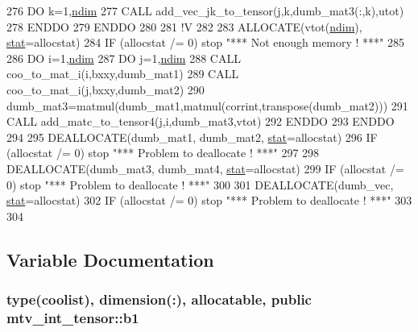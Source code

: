 \begin{DoxyCode}
276        \textcolor{keywordflow}{DO} k=1,\hyperlink{namespaceparams_a2323fe1773f086e20c14f266351c482b}{ndim}
277           \textcolor{keyword}{CALL }add\_vec\_jk\_to\_tensor(j,k,dumb\_mat3(:,k),utot)
278 \textcolor{keywordflow}{       ENDDO}
279 \textcolor{keywordflow}{    ENDDO}
280     
281     \textcolor{comment}{!V}
282     
283     \textcolor{keyword}{ALLOCATE}(vtot(\hyperlink{namespaceparams_a2323fe1773f086e20c14f266351c482b}{ndim}), \hyperlink{namespacestat}{stat}=allocstat)
284     \textcolor{keywordflow}{IF} (allocstat /= 0) stop \textcolor{stringliteral}{"*** Not enough memory ! ***"}
285 
286     \textcolor{keywordflow}{DO} i=1,\hyperlink{namespaceparams_a2323fe1773f086e20c14f266351c482b}{ndim}
287        \textcolor{keywordflow}{DO} j=1,\hyperlink{namespaceparams_a2323fe1773f086e20c14f266351c482b}{ndim}
288           \textcolor{keyword}{CALL }coo\_to\_mat\_i(i,bxxy,dumb\_mat1)
289           \textcolor{keyword}{CALL }coo\_to\_mat\_i(j,bxxy,dumb\_mat2)
290           dumb\_mat3=matmul(dumb\_mat1,matmul(corrint,transpose(dumb\_mat2)))
291           \textcolor{keyword}{CALL }add\_matc\_to\_tensor4(j,i,dumb\_mat3,vtot)
292 \textcolor{keywordflow}{       ENDDO}
293 \textcolor{keywordflow}{    ENDDO}
294 
295     \textcolor{keyword}{DEALLOCATE}(dumb\_mat1, dumb\_mat2, \hyperlink{namespacestat}{stat}=allocstat)
296     \textcolor{keywordflow}{IF} (allocstat /= 0)  stop \textcolor{stringliteral}{"*** Problem to deallocate ! ***"}
297 
298     \textcolor{keyword}{DEALLOCATE}(dumb\_mat3, dumb\_mat4, \hyperlink{namespacestat}{stat}=allocstat)
299     \textcolor{keywordflow}{IF} (allocstat /= 0)  stop \textcolor{stringliteral}{"*** Problem to deallocate ! ***"}
300 
301     \textcolor{keyword}{DEALLOCATE}(dumb\_vec, \hyperlink{namespacestat}{stat}=allocstat)
302     \textcolor{keywordflow}{IF} (allocstat /= 0)  stop \textcolor{stringliteral}{"*** Problem to deallocate ! ***"}
303 
304     
\end{DoxyCode}


\subsection{Variable Documentation}
\subsubsection[{\texorpdfstring{b1}{b1}}]{\setlength{\rightskip}{0pt plus 5cm}type({\bf coolist}), dimension(\+:), allocatable, public mtv\+\_\+int\+\_\+tensor\+::b1}\hypertarget{namespacemtv__int__tensor_a0220ca0d7f49bf405e6848492ec24995}{}\label{namespacemtv__int__tensor_a0220ca0d7f49bf405e6848492ec24995}


